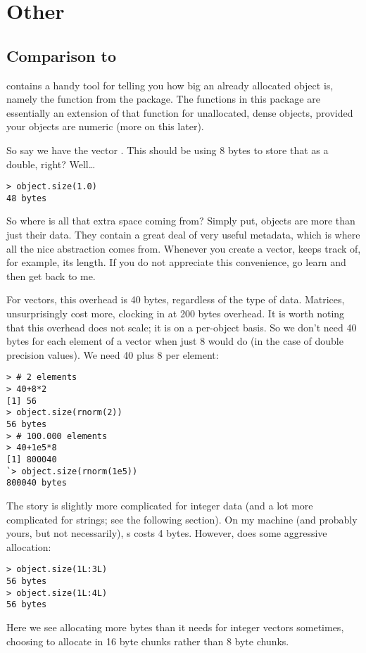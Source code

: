 \section{Other}

\subsection{Comparison to }

 contains a handy tool for telling you how big an already allocated 
object is, namely the  function from the  
package.  The functions in this package are essentially an extension of that 
function for unallocated, dense objects, provided your objects are numeric (more 
on this later).

So say we have the vector .  This should be using 8 bytes to 
store that  as a double, right?  Well\dots
\begin{lstlisting}[language=rr]
> object.size(1.0)
48 bytes
\end{lstlisting}

So where is all that extra space coming from?  Simply put,  objects 
are more than just their data.  They contain a great deal of very useful 
metadata, which is where all the nice abstraction comes from.  Whenever you 
create a vector,  keeps track of, for example, its length.  If you 
do not appreciate this convenience, go learn  and then get back to 
me.  

For vectors, this overhead is 40 bytes, regardless of the type of data.   
Matrices, unsurprisingly cost more, clocking in at 200 bytes overhead.  It is 
worth noting that this overhead does not scale; it is on a per-object basis.  So 
we don't need 40 bytes for each element of a vector when just 8 would do (in the 
case of double precision values).  We need 40 plus 8 per element:
\begin{lstlisting}[language=rr]
> # 2 elements
> 40+8*2
[1] 56
> object.size(rnorm(2))
56 bytes
> # 100.000 elements
> 40+1e5*8
[1] 800040
`> object.size(rnorm(1e5))
800040 bytes
\end{lstlisting}

The story is slightly more complicated for integer data (and a lot more 
complicated for strings; see the following section).  On my machine (and 
probably yours, but not necessarily), s costs 4 bytes.  However, 
 does some aggressive allocation:
\begin{lstlisting}[language=rr]
> object.size(1L:3L)
56 bytes
> object.size(1L:4L)
56 bytes
\end{lstlisting}
Here we see  allocating more bytes than it needs for integer vectors 
sometimes, choosing to allocate in 16 byte chunks rather than 8 byte chunks.

